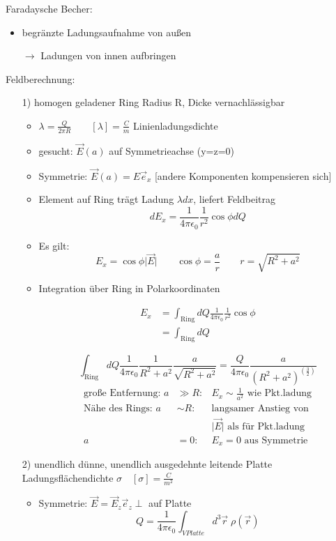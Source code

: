 \documentclass[titlepage,12pt,a4paper,ngerman]{report}
\newcommand{\tx}[1]{\textrm{#1}}
\begin{document}
Faradaysche Becher: 
\begin{itemize}
\item begränzte Ladungsaufnahme von außen
\item[$\rightarrow$] Ladungen von innen aufbringen
\end{itemize}
Feldberechnung:
\begin{itemize}
\item[1)] homogen geladener Ring Radius R, Dicke vernachlässigbar
\begin{itemize}
\item $\lambda = \frac{Q}{2\pi R} \qquad [\lambda] = \frac{C}{m}$ Linienladungsdichte\\
\item gesucht: $\vec{E}(a)$ auf Symmetrieachse (y=z=0)
\item Symmetrie: $\vec{E}(a) = E \vec{e}_x$ [andere Komponenten kompensieren sich]
\item Element auf Ring trägt Ladung $\lambda dx$, liefert Feldbeitrag $$dE_x = \frac{1}{4\pi \epsilon_0} \frac{1}{r^2} \cos \phi dQ$$
\item Es gilt: $$E_x = \cos \phi \vert \vec{E} \vert \qquad \cos\phi = \frac{a}{r} \qquad r= \sqrt{R^2+a^2}$$
\item Integration über Ring in Polarkoordinaten 


\begin{align*}
E_x & = \int_{\tx{Ring}} dQ \frac{1}{4\pi\epsilon_0} \frac{1}{r^2} \cos \phi \\
& = \int_{\tx{Ring}}dQ 
\end{align*}

$$\int_{\tx{Ring}} dQ \frac{1}{4\pi\epsilon_0} \frac{1}{R^2+a^2}\frac{a}{\sqrt{R^2+a^2}} = \frac{Q}{4\pi\epsilon_0} \frac{a}{(R^2+a^2)^{(\frac{3}{2})}}$$
\begin{align*}
\textrm{große Entfernung: }  a&\gg R : & E_x \sim \frac{1}{a^2} \textrm{ wie Pkt.ladung}\\
\textrm{Nähe des Rings: }  a &\sim R  : & \textrm{langsamer Anstieg von }\\ &&\vert \vec{E} \vert \textrm{ als für Pkt.ladung}\\
 a&=0: &E_x = 0  \textrm{ aus Symmetrie }
\end{align*}


\end{itemize}
\item[2)] unendlich dünne, unendlich ausgedehnte leitende Platte\\ Ladungsflächendichte $\sigma \quad [\sigma] = \frac{C}{m^2}$
\begin{itemize}
\item Symmetrie: $\vec{E} = \vec{E}_z \vec{e}_z \perp $ auf Platte
$$Q = \frac{1}{4 \pi \epsilon_0} \int_{V Platte} d^3 \vec{r}\; \rho ( \vec{r})$$


\end{itemize}
\end{itemize}
\end{document}
